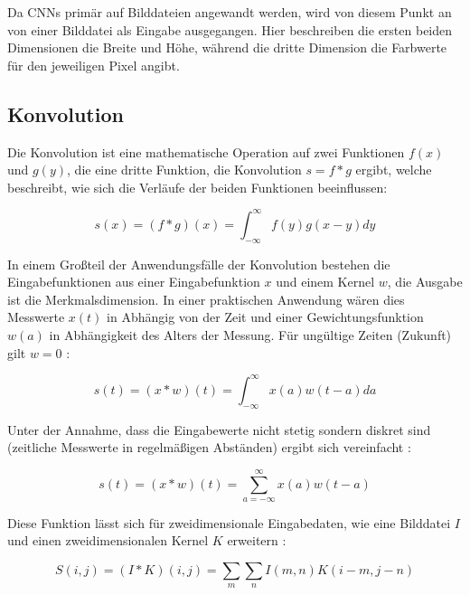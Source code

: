 
Da CNNs primär auf Bilddateien angewandt werden, wird von diesem Punkt an von einer Bilddatei als Eingabe ausgegangen. Hier beschreiben die ersten beiden Dimensionen die Breite und Höhe, während die dritte Dimension die Farbwerte für den jeweiligen Pixel angibt.

\subsection{Konvolution}
\label{ssec:conv}

Die Konvolution ist eine mathematische Operation auf zwei Funktionen $f(x)$ und $g(y)$, die eine dritte Funktion, die Konvolution $s = f*g$ ergibt, welche beschreibt, wie sich die Verläufe der beiden Funktionen beeinflussen:

\begin{equation}
s(x) = (f*g)(x) = \int_{-\infty}^{\infty} f(y)g(x-y)dy
\end{equation}

In einem Großteil der Anwendungsfälle der Konvolution bestehen die Eingabefunktionen aus einer Eingabefunktion $x$ und einem Kernel $w$, die Ausgabe ist die Merkmalsdimension. In einer praktischen Anwendung wären dies \bspw Messwerte $x(t)$ in Abhängig von der Zeit und einer Gewichtungsfunktion $w(a)$ in Abhängigkeit des Alters der Messung. Für ungültige Zeiten (\bspw Zukunft) gilt $w=0$ \cite[Kap.~9]{deeplearning_16}:

\begin{equation}
s(t) = (x*w)(t) = \int_{-\infty}^{\infty} x(a)w(t-a)da
\end{equation}

Unter der Annahme, dass die Eingabewerte nicht stetig sondern diskret sind (\bspw zeitliche Messwerte in regelmäßigen Abständen) ergibt sich vereinfacht \cite[Kap.~9]{deeplearning_16}:

\begin{equation}
s(t) = (x*w)(t) = \sum_{a=-\infty}^{\infty}x(a)w(t-a)
\end{equation}

Diese Funktion lässt sich für zweidimensionale Eingabedaten, wie \zB eine Bilddatei $I$ und einen zweidimensionalen Kernel $K$ erweitern \cite[Kap.~9]{deeplearning_16}:

\begin{equation}
S(i,j) = (I*K)(i,j) = \sum_{m}\sum_{n}I(m,n)K(i-m,j-n)
\end{equation}

